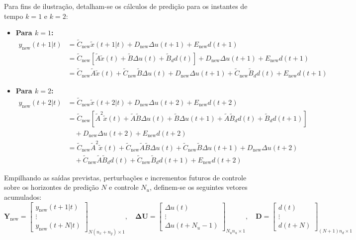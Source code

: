\documentclass[12pt]{article}
\begin{document}
Para fins de ilustração, detalham-se os cálculos de predição para os instantes de tempo $k=1$ e $k=2$:
\begin{itemize}
    \item {\bf Para $k=1$:}
    \begin{align}
    y_{\text{new}}(t+1|t) &= \tilde{C}_{\text{new}} \tilde{x}(t+1|t) + D_{\text{new}} \Delta u(t+1) + E_{\text{new}} d(t+1) \nonumber \\
             &= \tilde{C}_{\text{new}} \left[ \tilde{A} \tilde{x}(t) + \tilde{B} \Delta u(t) + \tilde{B}_d d(t) \right] + D_{\text{new}} \Delta u(t+1) + E_{\text{new}} d(t+1) \nonumber \\
             &= \tilde{C}_{\text{new}}\tilde{A} \tilde{x}(t) + \tilde{C}_{\text{new}}\tilde{B} \Delta u(t) + D_{\text{new}} \Delta u(t+1) + \tilde{C}_{\text{new}}\tilde{B}_d d(t) + E_{\text{new}} d(t+1)
    \end{align}
    
    \item {\bf Para $k=2$:}
    \begin{align}
    y_{\text{new}}(t+2|t) &= \tilde{C}_{\text{new}} \tilde{x}(t+2|t) + D_{\text{new}} \Delta u(t+2) + E_{\text{new}} d(t+2) \nonumber \\
             &= \tilde{C}_{\text{new}} \left[ \tilde{A}^2 \tilde{x}(t) + \tilde{A}\tilde{B} \Delta u(t) + \tilde{B} \Delta u(t+1) + \tilde{A}\tilde{B}_d d(t) + \tilde{B}_d d(t+1) \right] \nonumber \\
             & \quad + D_{\text{new}} \Delta u(t+2) + E_{\text{new}} d(t+2) \nonumber \\
             &= \tilde{C}_{\text{new}}\tilde{A}^2 \tilde{x}(t) + \tilde{C}_{\text{new}}\tilde{A}\tilde{B} \Delta u(t) + \tilde{C}_{\text{new}}\tilde{B} \Delta u(t+1) + D_{\text{new}} \Delta u(t+2) \nonumber \\
             & \quad + \tilde{C}_{\text{new}}\tilde{A}\tilde{B}_d d(t) + \tilde{C}_{\text{new}}\tilde{B}_d d(t+1) + E_{\text{new}} d(t+2)
    \end{align}
\end{itemize}

Empilhando as saídas previstas, perturbações e incrementos futuros de controle sobre os horizontes de predição $N$ e controle $N_u$, definem-se os seguintes vetores acumulados:
\begin{equation}
\bm{Y}_{\text{new}} = \begin{bmatrix} y_{\text{new}}(t+1|t) \\ \vdots \\ y_{\text{new}}(t+N|t) \end{bmatrix}_{N(n_x+n_y) \times 1}, \quad
\bm{\Delta U} = \begin{bmatrix} \Delta u(t) \\ \vdots \\ \Delta u(t+N_u-1) \end{bmatrix}_{N_u n_u \times 1}, \quad
\bm{D} = \begin{bmatrix} d(t) \\ \vdots \\ d(t+N) \end{bmatrix}_{(N+1)n_d \times 1}
\end{equation}
\end{document}
